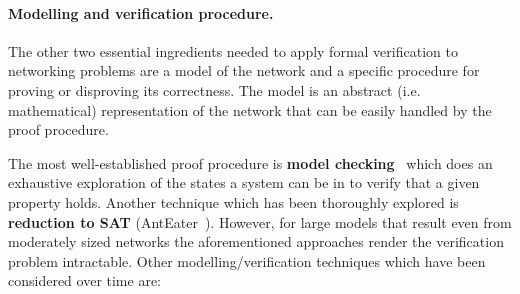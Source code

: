 \paragraph{Modelling and verification procedure.}
The other two essential ingredients needed to apply formal verification to
networking problems are a model of the network and a specific procedure for
proving or disproving its correctness.  The model is an abstract (i.e.
mathematical) representation of the network that can be easily handled by the
proof procedure.

The most well-established proof procedure is \textbf{model
checking}~\cite{clarke1999model, mcmillan2003model} which does an exhaustive
exploration of the states a system can be in to verify that a given property
holds. Another technique which has been thoroughly explored is
\textbf{reduction to SAT} (AntEater~\cite{mai2011debugging}).  However, for
large models that result even from moderately sized networks the aforementioned
approaches render the verification problem intractable.  Other
modelling/verification techniques which have been considered over time are:
